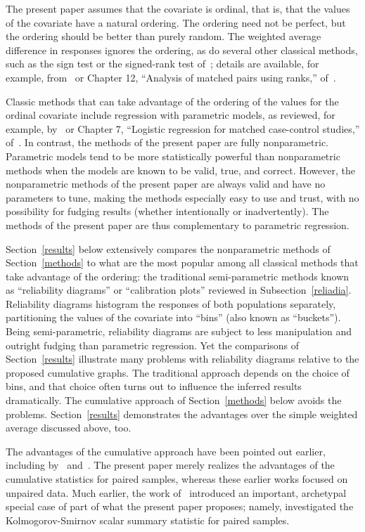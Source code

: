 \documentclass[]{fairmeta}
\begin{document}
The present paper assumes that the covariate is ordinal, that is,
that the values of the covariate have a natural ordering.
The ordering need not be perfect, but the ordering should be better
than purely random.
The weighted average difference in responses ignores the ordering,
as do several other classical methods, such as the sign test
or the signed-rank test of~\cite{wilcoxon};
details are available, for example, from~\cite{hollander-wolfe-chicken}
or Chapter 12, ``Analysis of matched pairs using ranks,''
of~\cite{brown-hollander}.

Classic methods that can take advantage of the ordering of the values
for the ordinal covariate include regression with parametric models,
as reviewed, for example, by~\cite{draper-smith}
or Chapter 7, ``Logistic regression for matched case-control studies,''
of~\cite{hosmer-lemeshow-sturdivant}.
In contrast, the methods of the present paper are fully nonparametric.
Parametric models tend to be more statistically powerful than nonparametric
methods when the models are known to be valid, true, and correct.
However, the nonparametric methods of the present paper are always valid
and have no parameters to tune, making the methods especially easy to use
and trust, with no possibility for fudging results (whether intentionally
or inadvertently). The methods of the present paper are thus complementary
to parametric regression.

Section~\ref{results} below extensively compares the nonparametric methods
of Section~\ref{methods} to what are the most popular
among all classical methods that take advantage of the ordering:
the traditional semi-parametric methods known as ``reliability diagrams''
or ``calibration plots'' reviewed in Subsection~\ref{reliadia}.
Reliability diagrams histogram the responses of both populations separately,
partitioning the values of the covariate into ``bins''
(also known as ``buckets''). Being semi-parametric, reliability diagrams
are subject to less manipulation and outright fudging
than parametric regression. Yet the comparisons of Section~\ref{results}
illustrate many problems with reliability diagrams relative
to the proposed cumulative graphs.
The traditional approach depends on the choice of bins,
and that choice often turns out to influence the inferred results dramatically.
The cumulative approach of Section~\ref{methods} below avoids the problems.
Section~\ref{results} demonstrates the advantages
over the simple weighted average discussed above, too.

The advantages of the cumulative approach have been pointed out earlier,
including by~\cite{arrieta-ibarra-gujral-tannen-tygert-xu}
and~\cite{tygert_multidim,tygert_full,tygert_two,tygert_pvals}.
The present paper merely realizes the advantages of the cumulative statistics
for paired samples, whereas these earlier works focused on unpaired data.
Much earlier, the work of~\cite{delgado} introduced an important, archetypal
special case of part of what the present paper proposes; namely,
\cite{delgado} investigated the Kolmogorov-Smirnov scalar summary statistic
for paired samples.
\end{document}
